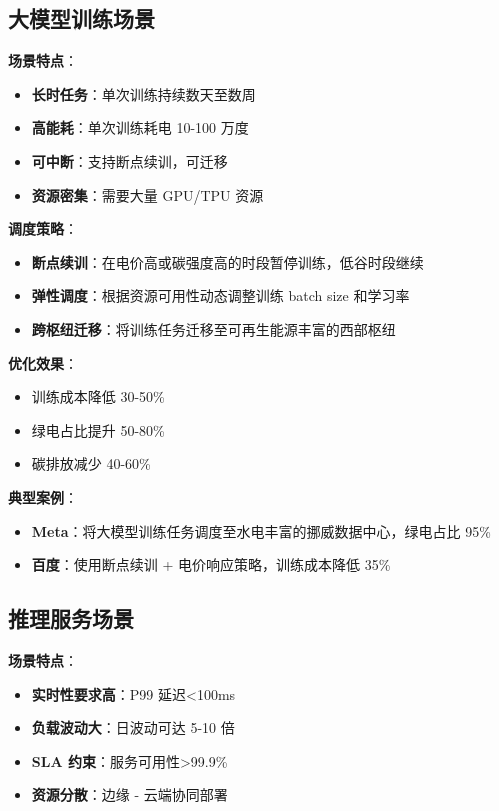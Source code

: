 \documentclass[12pt,a4paper]{article}
\begin{document}
\subsection{大模型训练场景}

\textbf{场景特点}：
\begin{itemize}
    \item \textbf{长时任务}：单次训练持续数天至数周
    \item \textbf{高能耗}：单次训练耗电 10-100 万度
    \item \textbf{可中断}：支持断点续训，可迁移
    \item \textbf{资源密集}：需要大量 GPU/TPU 资源
\end{itemize}

\textbf{调度策略}：
\begin{itemize}
    \item \textbf{断点续训}：在电价高或碳强度高的时段暂停训练，低谷时段继续
    \item \textbf{弹性调度}：根据资源可用性动态调整训练 batch size 和学习率
    \item \textbf{跨枢纽迁移}：将训练任务迁移至可再生能源丰富的西部枢纽
\end{itemize}

\textbf{优化效果}：
\begin{itemize}
    \item 训练成本降低 30-50\%
    \item 绿电占比提升 50-80\%
    \item 碳排放减少 40-60\%
\end{itemize}

\textbf{典型案例}：
\begin{itemize}
    \item \textbf{Meta}：将大模型训练任务调度至水电丰富的挪威数据中心，绿电占比 95\%
    \item \textbf{百度}：使用断点续训 + 电价响应策略，训练成本降低 35\%
\end{itemize}

\subsection{推理服务场景}

\textbf{场景特点}：
\begin{itemize}
    \item \textbf{实时性要求高}：P99 延迟<100ms
    \item \textbf{负载波动大}：日波动可达 5-10 倍
    \item \textbf{SLA 约束}：服务可用性>99.9\%
    \item \textbf{资源分散}：边缘 - 云端协同部署
\end{itemize}
\end{document}
